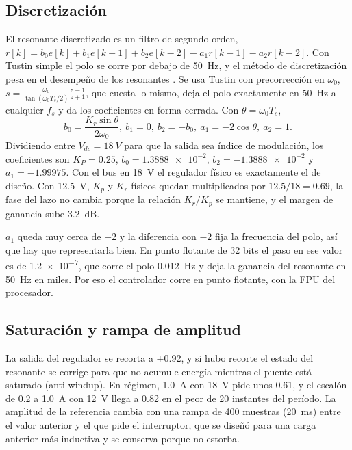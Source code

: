 \documentclass[journal]{IEEEtran}
\begin{document}
\subsection{Discretización}
\label{sec:disc}
El resonante discretizado es un filtro de segundo orden, $r[k]=b_0e[k]+b_1e[k-1]+b_2e[k-2]-a_1r[k-1]-a_2r[k-2]$. Con Tustin simple el polo se corre por debajo de \SI{50}{Hz}, y el método de discretización pesa en el desempeño de los resonantes \cite{yepes2010}. Se usa Tustin con precorrección en $\omega_0$, $s=\frac{\omega_0}{\tan(\omega_0T_s/2)}\frac{z-1}{z+1}$, que cuesta lo mismo, deja el polo exactamente en \SI{50}{Hz} a cualquier $f_s$ y da los coeficientes en forma cerrada. Con $\theta=\omega_0T_s$,
\begin{equation}
	b_0=\frac{K_r\sin\theta}{2\omega_0},\ b_1=0,\ b_2=-b_0,\ a_1=-2\cos\theta,\ a_2=1.
	\label{eq:coef}
\end{equation}
Dividiendo entre $V_{dc}=\SI{18}{V}$ para que la salida sea índice de modulación, los coeficientes son $K_P=\num{0.25}$, $b_0=\num{1.3888e-2}$, $b_2=-\num{1.3888e-2}$ y $a_1=-\num{1.99975}$. Con el bus en \SI{18}{V} el regulador físico es exactamente el de diseño. Con \SI{12.5}{V}, $K_p$ y $K_r$ físicos quedan multiplicados por $12.5/18=\num{0.69}$, la fase del lazo no cambia porque la relación $K_r/K_p$ se mantiene, y el margen de ganancia sube \SI{3.2}{dB}.

$a_1$ queda muy cerca de $-2$ y la diferencia con $-2$ fija la frecuencia del polo, así que hay que representarla bien. En punto flotante de \num{32} bits el paso en ese valor es de \num{1.2e-7}, que corre el polo \SI{0.012}{Hz} y deja la ganancia del resonante en \SI{50}{Hz} en miles. Por eso el controlador corre en punto flotante, con la FPU del procesador.

\subsection{Saturación y rampa de amplitud}
\label{sec:sat}
La salida del regulador se recorta a $\pm0.92$, y si hubo recorte el estado del resonante se corrige para que no acumule energía mientras el puente está saturado (anti-windup). En régimen, \SI{1.0}{A} con \SI{18}{V} pide unos \num{0.61}, y el escalón de \num{0.2} a \SI{1.0}{A} con \SI{12}{V} llega a \num{0.82} en el peor de \num{20} instantes del período. La amplitud de la referencia cambia con una rampa de \num{400} muestras (\SI{20}{ms}) entre el valor anterior y el que pide el interruptor, que se diseñó para una carga anterior más inductiva y se conserva porque no estorba.
\end{document}

